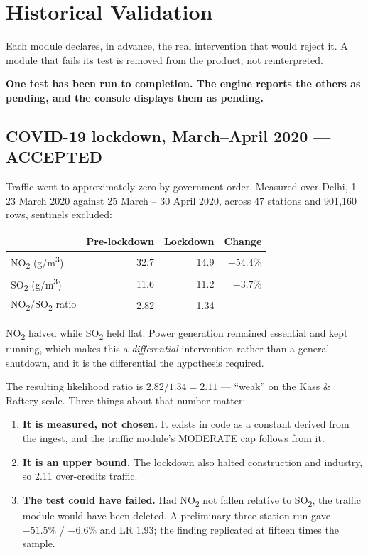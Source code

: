\documentclass[11pt,a4paper]{article}
\newcommand{\keyclaim}[1]{%
  \par\vspace{0.7ex}\noindent
  \colorbox{vwash}{\parbox{\dimexpr\linewidth-2\fboxsep}{%
    \color{vblack}\textbf{#1}}}%
  \par\vspace{0.9ex}}
\newcommand{\NOx}{NO\textsubscript{2}}
\newcommand{\SOx}{SO\textsubscript{2}}
\newcommand{\ugm}{\textmu g/m\textsuperscript{3}}
\begin{document}
\section{Historical Validation}
\label{sec:validation}

Each module declares, in advance, the real intervention that would reject it. A
module that fails its test is removed from the product, not reinterpreted.

\keyclaim{One test has been run to completion. The engine reports the others as
pending, and the console displays them as pending.}

\subsection{COVID-19 lockdown, March--April 2020 --- ACCEPTED}

Traffic went to approximately zero by government order. Measured over Delhi, 1--23
March 2020 against 25 March -- 30 April 2020, across 47 stations and 901{,}160 rows,
sentinels excluded:

\begin{center}
\small
\begin{tabular}{@{}l r r r@{}}
\toprule
& \textbf{Pre-lockdown} & \textbf{Lockdown} & \textbf{Change} \\
\midrule
\NOx{} (\ugm) & 32.7 & 14.9 & $-54.4\%$ \\
\SOx{} (\ugm) & 11.6 & 11.2 & $-3.7\%$ \\
\NOx{}/\SOx{} ratio & 2.82 & 1.34 & \\
\bottomrule
\end{tabular}
\end{center}

\NOx{} halved while \SOx{} held flat. Power generation remained essential and kept
running, which makes this a \emph{differential} intervention rather than a general
shutdown, and it is the differential the hypothesis required.

The resulting likelihood ratio is $2.82 / 1.34 = 2.11$ --- ``weak'' on the Kass \&
Raftery scale. Three things about that number matter:

\begin{enumerate}
  \item \textbf{It is measured, not chosen.} It exists in code as a constant derived
  from the ingest, and the traffic module's MODERATE cap follows from it.
  \item \textbf{It is an upper bound.} The lockdown also halted construction and
  industry, so 2.11 over-credits traffic.
  \item \textbf{The test could have failed.} Had \NOx{} not fallen relative to
  \SOx{}, the traffic module would have been deleted. A preliminary three-station
  run gave $-51.5\%$ / $-6.6\%$ and LR 1.93; the finding replicated at fifteen times
  the sample.
\end{enumerate}
\end{document}
